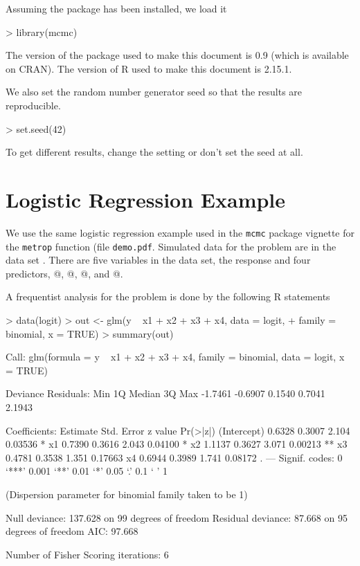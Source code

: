 \documentclass[11pt]{article}
\begin{document}
Assuming the \verb@mcmc@ package has been installed, we load it
\begin{Schunk}
\begin{Sinput}
> library(mcmc)
\end{Sinput}
\end{Schunk}
The version of the package used to make this document
is 0.9 (which is available on CRAN).
The version of R used to make this document is 2.15.1.

We also set the random number generator seed so that the results are
reproducible.
\begin{Schunk}
\begin{Sinput}
> set.seed(42)
\end{Sinput}
\end{Schunk}
To get different results, change the setting or don't set the seed at all.

\section{Logistic Regression Example}

We use the same logistic regression example used in the \texttt{mcmc}
package vignette for the \texttt{metrop} function (file \texttt{demo.pdf}.
Simulated data for the problem are in the data set \verb@logit@.
There are five variables in the data set, the response \verb@y@
and four predictors, @, @, @, and @.

A frequentist analysis for the problem is done by the following R statements
\begin{Schunk}
\begin{Sinput}
> data(logit)
> out <- glm(y ~ x1 + x2 + x3 + x4, data = logit,
+     family = binomial, x = TRUE)
> summary(out)
\end{Sinput}
\begin{Soutput}
Call:
glm(formula = y ~ x1 + x2 + x3 + x4, family = binomial, data = logit, 
    x = TRUE)

Deviance Residuals: 
    Min       1Q   Median       3Q      Max  
-1.7461  -0.6907   0.1540   0.7041   2.1943  

Coefficients:
            Estimate Std. Error z value Pr(>|z|)   
(Intercept)   0.6328     0.3007   2.104  0.03536 * 
x1            0.7390     0.3616   2.043  0.04100 * 
x2            1.1137     0.3627   3.071  0.00213 **
x3            0.4781     0.3538   1.351  0.17663   
x4            0.6944     0.3989   1.741  0.08172 . 
---
Signif. codes:  0 ‘***’ 0.001 ‘**’ 0.01 ‘*’ 0.05 ‘.’ 0.1 ‘ ’ 1 

(Dispersion parameter for binomial family taken to be 1)

    Null deviance: 137.628  on 99  degrees of freedom
Residual deviance:  87.668  on 95  degrees of freedom
AIC: 97.668

Number of Fisher Scoring iterations: 6
\end{Soutput}
\end{Schunk}
\end{document}
